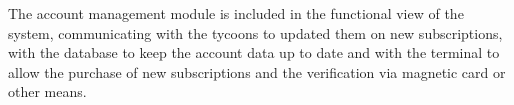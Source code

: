 The account management module is included in the functional view of the system, communicating with the tycoons to updated them on new subscriptions, with the database to keep the account data up to date and with the terminal to allow 
the purchase of new subscriptions and the verification via magnetic card or other means.